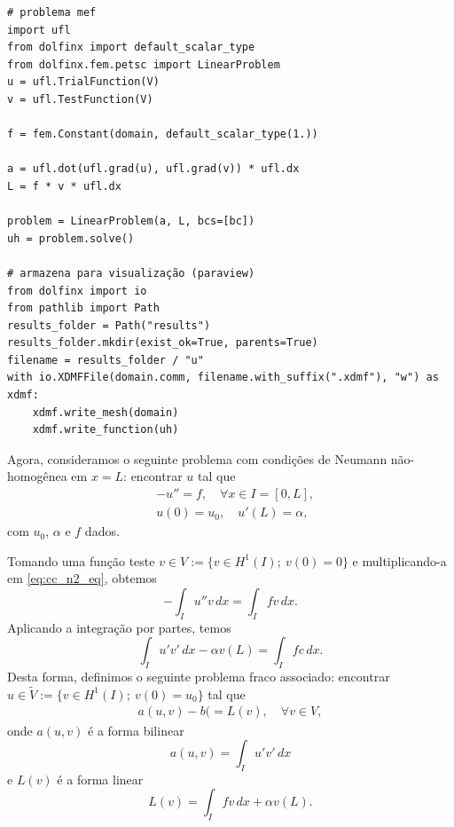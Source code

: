 \begin{ex}
\begin{lstlisting}[caption=ex\_mef1d\_neumann.py]
# problema mef
import ufl
from dolfinx import default_scalar_type
from dolfinx.fem.petsc import LinearProblem
u = ufl.TrialFunction(V)
v = ufl.TestFunction(V)

f = fem.Constant(domain, default_scalar_type(1.))

a = ufl.dot(ufl.grad(u), ufl.grad(v)) * ufl.dx
L = f * v * ufl.dx

problem = LinearProblem(a, L, bcs=[bc])
uh = problem.solve()

# armazena para visualização (paraview)
from dolfinx import io
from pathlib import Path
results_folder = Path("results")
results_folder.mkdir(exist_ok=True, parents=True)
filename = results_folder / "u"
with io.XDMFFile(domain.comm, filename.with_suffix(".xdmf"), "w") as xdmf:
    xdmf.write_mesh(domain)
    xdmf.write_function(uh)

\end{lstlisting}

\end{ex}

Agora, consideramos o seguinte problema com condições de Neumann não-homogênea em $x=L$: encontrar $u$ tal que
\begin{align}
  &-u'' = f,\quad \forall x\in I=[0, L],\label{eq:cc_n2_eq}\\
  &u(0) = u_0,\quad u'(L) = \alpha,\label{eq:cc_n2_bc}
\end{align}
com $u_0$, $\alpha$ e $f$ dados.

Tomando uma função teste $v\in V:=\{v\in H^1(I);~v(0)=0\}$ e multiplicando-a em \eqref{eq:cc_n2_eq}, obtemos
\begin{equation}
  - \int_I u''v\,dx = \int_I fv\,dx.
\end{equation}
Aplicando a integração por partes, temos
\begin{equation}
  \int_I u'v'\,dx - \alpha v(L)= \int_I fc\,dx.
\end{equation}
Desta forma, definimos o seguinte problema fraco associado: encontrar $u\in \tilde{V} := \{v\in H^1(I);~v(0)=u_0\}$ tal que
\begin{align}
  a(u,v) - b( = L(v),\quad\forall v\in V,
\end{align}
onde $a(u,v)$ é a forma bilinear
\begin{equation}
  a(u,v) = \int_I u'v'\,dx
\end{equation}
e $L(v)$ é a forma linear
\begin{equation}
  L(v) = \int_I fv\,dx + \alpha v(L).
\end{equation}

